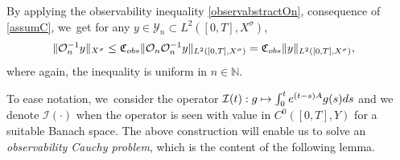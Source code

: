 \documentclass[11pt]{article}
\newcommand\mto{\mathchoice{\longmapsto}{\mapsto}{\mapsto}{\mapsto}}
\theoremstyle{definition}
\let\mc\mathcal
\renewcommand{\O}{\mc{O}}
\newcommand{\Y}{\mc{Y}}
\newcommand{\N}{\mathbb{N}}
\providecommand{\norm}[1]{\lVert#1\rVert}
\begin{document}
By applying the observability inequality \eqref{observabstractOn}, consequence of \cref{assumC}, we~get for any $y\in \Y_n \subset L^2([0, T], X^\sigma)$,
\begin{align}
\label{boundOn-1}
\norm{\O_n^{-1}y}_{X^\sigma}&\leq \mathfrak{C}_{\textup{obs}}\norm{\O_{n}\O_n^{-1}y}_{L^2([0, T], X^\sigma)}=\mathfrak{C}_{\textup{obs}}\norm{y}_{L^2([0, T], X^\sigma)},
\end{align}
where again, the inequality is uniform in $n\in \N$.

To ease notation, we~consider the operator $\mc{I}(t): g\mto \int_0^t e^{(t-s)A}g(s)ds$ and we denote $\mc{I}(\cdot)$ when the operator is seen with value in $C^{0}([0,T],Y)$ for a suitable Banach space. The above construction will enable us to solve an \emph{observability Cauchy problem}, which is the content of the following lemma.
\end{document}
